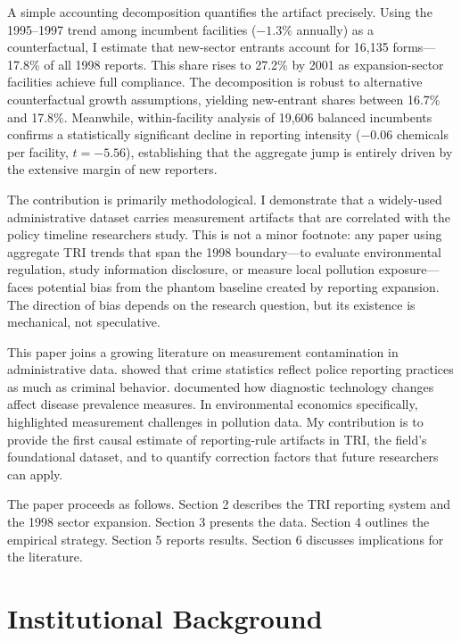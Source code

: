 \documentclass[12pt]{article}
\begin{document}
A simple accounting decomposition quantifies the artifact precisely. Using the 1995--1997 trend among incumbent facilities ($-1.3\%$ annually) as a counterfactual, I estimate that new-sector entrants account for 16,135 forms---17.8\% of all 1998 reports. This share rises to 27.2\% by 2001 as expansion-sector facilities achieve full compliance. The decomposition is robust to alternative counterfactual growth assumptions, yielding new-entrant shares between 16.7\% and 17.8\%. Meanwhile, within-facility analysis of 19,606 balanced incumbents confirms a statistically significant decline in reporting intensity ($-0.06$ chemicals per facility, $t = -5.56$), establishing that the aggregate jump is entirely driven by the extensive margin of new reporters.

The contribution is primarily methodological. I demonstrate that a widely-used administrative dataset carries measurement artifacts that are correlated with the policy timeline researchers study. This is not a minor footnote: any paper using aggregate TRI trends that span the 1998 boundary---to evaluate environmental regulation, study information disclosure, or measure local pollution exposure---faces potential bias from the phantom baseline created by reporting expansion. The direction of bias depends on the research question, but its existence is mechanical, not speculative.

This paper joins a growing literature on measurement contamination in administrative data. \citet{levitt1998anatomy} showed that crime statistics reflect police reporting practices as much as criminal behavior. \citet{currie2020technology} documented how diagnostic technology changes affect disease prevalence measures. In environmental economics specifically, \citet{auffhammer2014measuring} highlighted measurement challenges in pollution data. My contribution is to provide the first causal estimate of reporting-rule artifacts in TRI, the field's foundational dataset, and to quantify correction factors that future researchers can apply.

The paper proceeds as follows. Section 2 describes the TRI reporting system and the 1998 sector expansion. Section 3 presents the data. Section 4 outlines the empirical strategy. Section 5 reports results. Section 6 discusses implications for the literature.

\section{Institutional Background}
\end{document}
